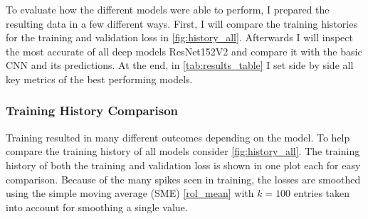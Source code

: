 To evaluate how the different models were able to perform, I prepared the resulting data in a few different ways. First, I will compare the training histories for the training and validation loss in \autoref{fig:history_all}. Afterwards I will inspect the most accurate of all deep models ResNet152V2 and compare it with the basic CNN and its predictions. At the end, in \autoref{tab:results_table} I set side by side all key metrics of the best performing models.

\subsubsection{Training History Comparison}

Training resulted in many different outcomes depending on the model. To help compare the training history of all models consider \autoref{fig:history_all}. The training history of both the training and validation loss is shown in one plot each for easy comparison. Because of the many spikes seen in training, the losses are smoothed using the simple moving average (SME) \eqref{rol_mean} with $k = 100$ entries taken into account for smoothing a single value.

